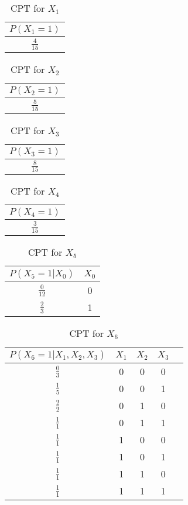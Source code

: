 \documentclass{article}
\begin{document}
\begin{table}[H]
\centering
\begin{tabular}{|c|}
\hline
$P(X_1 = 1)$  \\ \hline
$\frac{4}{15}$ \\ \hline
\end{tabular}
\caption{CPT for $X_1$}
\end{table}

\begin{table}[H]
\centering
\begin{tabular}{|c|}
\hline
$P(X_2 = 1)$  \\ \hline
$\frac{5}{15}$  \\ \hline
\end{tabular}
\caption{CPT for $X_2$}
\end{table}

\begin{table}[H]
\centering
\begin{tabular}{|c|}
\hline
$P(X_3 = 1)$  \\ \hline
$\frac{8}{15}$ \\ \hline
\end{tabular}
\caption{CPT for $X_3$}
\end{table}

\begin{table}[H]
\centering
\begin{tabular}{|c|}
\hline
$P(X_4 = 1)$  \\ \hline
$\frac{3}{15}$  \\ \hline
\end{tabular}
\caption{CPT for $X_4$}
\end{table}

\begin{table}[H]
\centering
\begin{tabular}{|c|c|}
\hline
$P(X_5 = 1 | X_0)$ & $X_0$ \\ \hline
$\frac{0}{12}$ & 0 \\ \hline
$\frac{2}{3}$ & 1 \\ \hline
\end{tabular}
\caption{CPT for $X_5$}
\end{table}

\begin{table}[H]
\centering
\begin{tabular}{|c|c|c|c|c|}
\hline
$P(X_6 = 1 | X_1, X_2, X_3)$ & $X_1$ & $X_2$ & $X_3$ \\ \hline
$\frac{0}{3}$ & 0 & 0 & 0 \\ \hline
$\frac{1}{5}$ & 0 & 0 & 1 \\ \hline
$\frac{2}{2}$ & 0 & 1 & 0 \\ \hline
$\frac{1}{1}$ & 0 & 1 & 1 \\ \hline
$\frac{1}{1}$ & 1 & 0 & 0 \\ \hline
$\frac{1}{1}$ & 1 & 0 & 1 \\ \hline
$\frac{1}{1}$ & 1 & 1 & 0 \\ \hline
$\frac{1}{1}$ & 1 & 1 & 1 \\ \hline
\end{tabular}
\caption{CPT for $X_6$}
\end{table}
\end{document}
